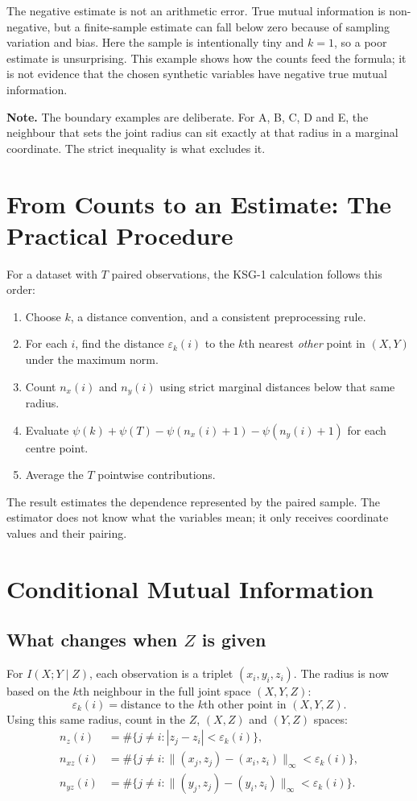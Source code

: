 \documentclass[11pt,letterpaper,oneside]{report}
\newcommand{\epsk}{\varepsilon_k}
\newcommand{\Note}[1]{\par\noindent\colorbox{notegray}{\parbox{0.965\linewidth}{\textbf{Note.} #1}}\par}
\begin{document}
The negative estimate is not an arithmetic error. True mutual information is non-negative, but a finite-sample estimate can fall below zero because of sampling variation and bias. Here the sample is intentionally tiny and $k=1$, so a poor estimate is unsurprising. This example shows how the counts feed the formula; it is not evidence that the chosen synthetic variables have negative true mutual information.

\Note{The boundary examples are deliberate. For A, B, C, D and E, the neighbour that sets the joint radius can sit exactly at that radius in a marginal coordinate. The strict inequality is what excludes it.}

\section{From Counts to an Estimate: The Practical Procedure}

For a dataset with $T$ paired observations, the KSG-1 calculation follows this order:
\begin{enumerate}[label=\textbf{Step \arabic*.}]
\item Choose $k$, a distance convention, and a consistent preprocessing rule.
\item For each $i$, find the distance $\epsk(i)$ to the $k$th nearest \emph{other} point in $(X,Y)$ under the maximum norm.
\item Count $n_x(i)$ and $n_y(i)$ using strict marginal distances below that same radius.
\item Evaluate $\psi(k)+\psi(T)-\psi(n_x(i)+1)-\psi(n_y(i)+1)$ for each centre point.
\item Average the $T$ pointwise contributions.
\end{enumerate}

The result estimates the dependence represented by the paired sample. The estimator does not know what the variables mean; it only receives coordinate values and their pairing.

\section{Conditional Mutual Information}

\subsection{What changes when $Z$ is given}

For $I(X;Y\mid Z)$, each observation is a triplet $(x_i,y_i,z_i)$. The radius is now based on the $k$th neighbour in the full joint space $(X,Y,Z)$:
\begin{equation}
  \epsk(i)=\text{distance to the $k$th other point in }(X,Y,Z).
\end{equation}
Using this same radius, count in the $Z$, $(X,Z)$ and $(Y,Z)$ spaces:
\begin{align}
  n_z(i)&=\#\{j\ne i:|z_j-z_i|<\epsk(i)\},\\
  n_{xz}(i)&=\#\{j\ne i:\lVert(x_j,z_j)-(x_i,z_i)\rVert_\infty<\epsk(i)\},\\
  n_{yz}(i)&=\#\{j\ne i:\lVert(y_j,z_j)-(y_i,z_i)\rVert_\infty<\epsk(i)\}.
\end{align}
\end{document}
